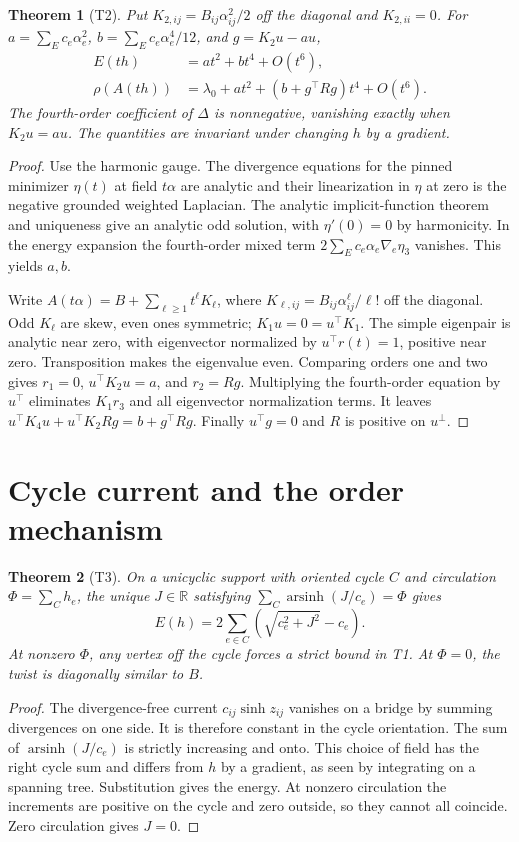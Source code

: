 \documentclass[11pt]{article}
\newtheorem{theorem}{Theorem}
\DeclareMathOperator{\arsinh}{arsinh}
\newcommand{\R}{\mathbb R}
\begin{document}
\begin{theorem}[T2]
Put \(K_{2,ij}=B_{ij}\alpha_{ij}^2/2\) off the diagonal and \(K_{2,ii}=0\).
For \(a=\sum_E c_e\alpha_e^2\), \(b=\sum_E c_e\alpha_e^4/12\), and
\(g=K_2u-au\),
\begin{align*}
 E(th)&=at^2+bt^4+O(t^6),\\
 \rho(A(th))&=\lambda_0+at^2+(b+g^\top Rg)t^4+O(t^6).
\end{align*}
The fourth-order coefficient of \(\Delta\) is nonnegative, vanishing
exactly when \(K_2u=au\). The quantities are invariant under changing \(h\)
by a gradient.
\end{theorem}
\begin{proof}
Use the harmonic gauge. The divergence equations for the pinned
minimizer \(\eta(t)\) at field \(t\alpha\) are analytic and their
linearization in \(\eta\) at zero is the negative grounded weighted
Laplacian. The analytic implicit-function theorem and uniqueness
give an analytic odd solution, with \(\eta'(0)=0\) by harmonicity.
In the energy expansion the fourth-order mixed term
\(2\sum_E c_e\alpha_e\nabla_e\eta_3\) vanishes. This yields \(a,b\).

Write \(A(t\alpha)=B+\sum_{\ell\geq1}t^\ell K_\ell\), where
\(K_{\ell,ij}=B_{ij}\alpha_{ij}^{\ell}/\ell!\) off the diagonal.
Odd \(K_\ell\) are skew, even ones symmetric; \(K_1u=0=u^\top K_1\).
The simple eigenpair is analytic near zero, with eigenvector normalized
by \(u^\top r(t)=1\), positive near zero. Transposition makes the
eigenvalue even. Comparing orders one and two gives \(r_1=0\),
\(u^\top K_2u=a\), and \(r_2=Rg\). Multiplying the fourth-order
equation by \(u^\top\) eliminates \(K_1r_3\) and all eigenvector
normalization terms. It leaves \(u^\top K_4u+u^\top K_2Rg=b+g^\top Rg\).
Finally \(u^\top g=0\) and \(R\) is positive on \(u^\perp\).
\end{proof}

\section{Cycle current and the order mechanism}
\begin{theorem}[T3]
On a unicyclic support with oriented cycle \(C\) and circulation
\(\Phi=\sum_C h_e\), the unique \(J\in\R\) satisfying
\(\sum_C\arsinh(J/c_e)=\Phi\) gives
\[
 E(h)=2\sum_{e\in C}(\sqrt{c_e^2+J^2}-c_e).
\]
At nonzero \(\Phi\), any vertex off the cycle forces a strict bound in T1.
At \(\Phi=0\), the twist is diagonally similar to \(B\).
\end{theorem}
\begin{proof}
The divergence-free current \(c_{ij}\sinh z_{ij}\) vanishes on a bridge
by summing divergences on one side. It is therefore constant in the cycle
orientation. The sum of \(\arsinh(J/c_e)\) is strictly increasing and
onto. This choice of field has the right cycle sum and differs from \(h\)
by a gradient, as seen by integrating on a spanning tree. Substitution
gives the energy. At nonzero circulation the increments are positive
on the cycle and zero outside, so they cannot all coincide. Zero
circulation gives \(J=0\).
\end{proof}
\end{document}
